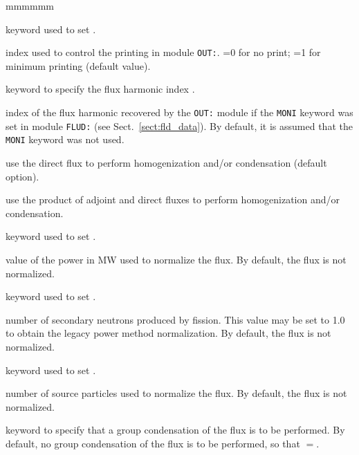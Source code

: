 \begin{ListeDeDescription}{mmmmmm}

\item[\moc{EDIT}] keyword used to set .

\item[\dusa{iprint}] index used to control the printing in module {\tt OUT:}. =0 for no print; =1 for minimum printing (default value).

\item[\moc{MODE}] keyword to specify the flux harmonic index .

\item[\dusa{imode}] index of the flux harmonic recovered by the {\tt OUT:} module if the {\tt MONI} keyword was set in module {\tt FLUD:}
(see Sect.~\ref{sect:fld_data}). By default, it is assumed that the {\tt MONI} keyword was not used.

\item[\moc{DIRE}] use the direct flux to perform homogenization and/or condensation (default option).

\item[\moc{PROD}] use the product of adjoint and direct fluxes to perform homogenization and/or condensation.

\item[\moc{POWR}] keyword used to set .

\item[\dusa{power}] value of the power in MW used to normalize the flux. By default, the flux is not normalized.

\item[\moc{FISS}] keyword used to set .

\item[\dusa{number}] number of secondary neutrons produced by fission. This value may be set to 1.0 to obtain the
legacy power method normalization. By default, the flux is not normalized.

\item[\moc{SOUR}] keyword used to set .

\item[\dusa{snumb}] number of source particles used to normalize the flux. By default, the flux is not normalized.

\item[\moc{COND}] keyword to specify that a group condensation of the flux is
to be performed. By default, no group condensation of the flux is
to be performed, so that $=$.


\end{ListeDeDescription}
